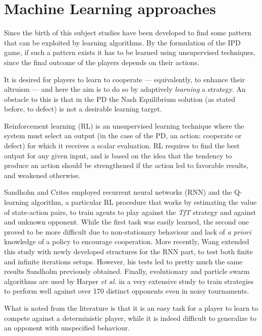 \documentclass[journal,a4paper,10pt,twoside]{IEEEtran} %
\begin{document}
\section{Machine Learning approaches} \label{s:ml}
Since the birth of this subject studies have been developed to find some pattern that can be exploited by learning algorithms.
By the formulation of the IPD game, if such a pattern exists it has to be learned using unsupervised techniques, since the final outcome of the players depends on their actions.

It is desired for players to learn to cooperate --- equivalently, to enhance their altruism --- and here the aim is to do so by adaptively \textit{learning} a strategy. An obstacle to this is that in the PD the Nash Equilibrium solution (as stated before, to defect) is not a desirable learning target. \cite{coopSeqRL}

Reinforcement learning (RL) is an unsupervised learning technique where the system must select an output (in the case of the PD, an action: cooperate or defect) for which it receives a scalar evaluation. RL requires to find the best output for any given input, and is based on the idea that the tendency to produce an action should be strengthened if the action led to favorable results, and weakened otherwise. \cite{sandholmRL}

Sandholm and Crites \cite{sandholmRL} employed recurrent neural networks (RNN) and the Q-learning algorithm, a particular RL procedure that works by estimating the value of state-action pairs, to train agents to play against the \textit{TfT} strategy and against and unknown opponent. While the first task was easily learned, the second one proved to be more difficult due to non-stationary behaviour and lack of \textit{a priori} knowledge of a policy to encourage cooperation.
More recently, Wang \cite{kedaoRL} extended this study with newly developed structures for the RNN part, to test both finite and infinite iterations setups. However, his tests led to pretty much the same results Sandholm previously obtained.
Finally, evolutionary and particle swarm algorithms are used by Harper \textit{et al.} in a very extensive study \cite{plosRLdominant} to train strategies to perform well against over 170 distinct opponents even in noisy tournaments.

What is noted from the literature is that it is an easy task for a player to learn to compete against a deterministic player, while it is indeed difficult to generalize to an opponent with unspecified behaviour.
\end{document}
